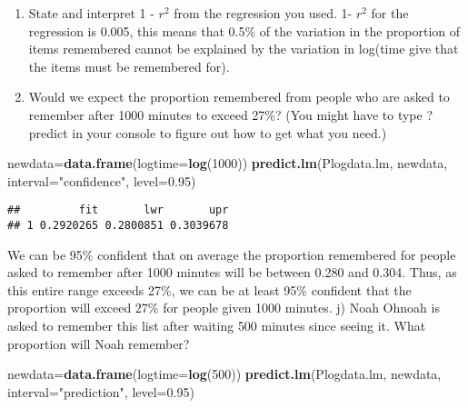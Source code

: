 \documentclass[12pt,]{article}
\newenvironment{Shaded}{\begin{snugshade}}{\end{snugshade}}
\newcommand{\KeywordTok}[1]{\textcolor[rgb]{0.13,0.29,0.53}{\textbf{#1}}}
\newcommand{\DataTypeTok}[1]{\textcolor[rgb]{0.13,0.29,0.53}{#1}}
\newcommand{\DecValTok}[1]{\textcolor[rgb]{0.00,0.00,0.81}{#1}}
\newcommand{\FloatTok}[1]{\textcolor[rgb]{0.00,0.00,0.81}{#1}}
\newcommand{\StringTok}[1]{\textcolor[rgb]{0.31,0.60,0.02}{#1}}
\newcommand{\NormalTok}[1]{#1}
\begin{document}
\begin{enumerate}
\def\labelenumi{\alph{enumi})}
\setcounter{enumi}{7}
\item
  State and interpret 1 - \(r^2\) from the regression you used. 1-
  \(r^2\) for the regression is 0.005, this means that 0.5\% of the
  variation in the proportion of items remembered cannot be explained by
  the variation in log(time give that the items must be remembered for).
\item
  Would we expect the proportion remembered from people who are asked to
  remember after 1000 minutes to exceed 27\%? (You might have to type
  ?predict in your console to figure out how to get what you need.)
\end{enumerate}

\begin{Shaded}
\begin{Highlighting}[]
\NormalTok{newdata=}\KeywordTok{data.frame}\NormalTok{(}\DataTypeTok{logtime=}\KeywordTok{log}\NormalTok{(}\DecValTok{1000}\NormalTok{))}
\KeywordTok{predict.lm}\NormalTok{(Plogdata.lm, newdata, }\DataTypeTok{interval=}\StringTok{"confidence"}\NormalTok{, }\DataTypeTok{level=}\FloatTok{0.95}\NormalTok{)}
\end{Highlighting}
\end{Shaded}

\begin{verbatim}
##         fit       lwr       upr
## 1 0.2920265 0.2800851 0.3039678
\end{verbatim}

We can be 95\% confident that on average the proportion remembered for
people asked to remember after 1000 minutes will be between 0.280 and
0.304. Thus, as this entire range exceeds 27\%, we can be at least 95\%
confident that the proportion will exceed 27\% for people given 1000
minutes. j) Noah Ohnoah is asked to remember this list after waiting 500
minutes since seeing it. What proportion will Noah remember?

\begin{Shaded}
\begin{Highlighting}[]
\NormalTok{newdata=}\KeywordTok{data.frame}\NormalTok{(}\DataTypeTok{logtime=}\KeywordTok{log}\NormalTok{(}\DecValTok{500}\NormalTok{))}
\KeywordTok{predict.lm}\NormalTok{(Plogdata.lm, newdata, }\DataTypeTok{interval=}\StringTok{"prediction"}\NormalTok{, }\DataTypeTok{level=}\FloatTok{0.95}\NormalTok{)}
\end{Highlighting}
\end{Shaded}
\end{document}

